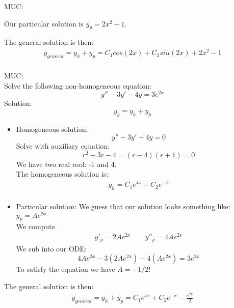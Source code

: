 \begin{exmp}{MUC:}
\begin{itemize}
Our particular solution is $y_p=2x^2-1$.
\end{itemize}
The general solution is then:
\begin{align*}
y_{general}=y_h+y_p=C_1 cos(2x)+C_2 sin(2x) +2x^2-1\\
\end{align*}
\end{exmp}


\begin{exmp}{MUC:}\\
Solve the following non-homogeneous equation:
\begin{equation*}
y''-3y'-4y=3e^{2x}
\end{equation*}
Solution:\\

\begin{equation}
y_{g}=y_{h} + y_{p} 
\end{equation}
\begin{itemize}
\item Homogeneous solution:
\begin{equation*}
y''-3y'-4y=0
\end{equation*}
Solve with auxiliary equation:
\begin{equation*}
r^2-3r-4= (r-4)(r+1)=0
\end{equation*}
We have two real rool: -1 and 4.\\
The homogeneous solution is:
\begin{align*}
y_h=C_1 e^{4x}+C_2 e^{-x}\\
\end{align*}
\item Particular solution:
We guess that our solution looks something like: $y_p=Ae^{2x}$\\
We compute 
\begin{align*}
y'_p=2Ae^{2x} \qquad y''_p=4Ae^{2x}
\end{align*}
We sub into our ODE:
\begin{equation*}
4Ae^{2x}-3(2Ae^{2x})-4(Ae^{2x})=3e^{2x}
\end{equation*}
To satisfy the equation we have $A=-1/2$!

\end{itemize}
The general solution is then:
\begin{align*}
y_{general}=y_h+y_p=C_1 e^{4x}+C_2 e^{-x} - \frac{e^{2x}}{2}
\end{align*}
\end{exmp}



